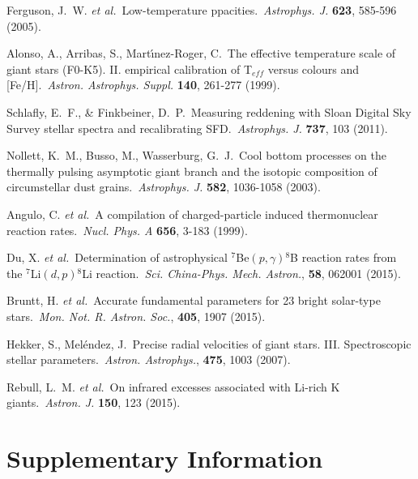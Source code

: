 \documentclass[twoside,onecolumnm,12pt]{article}
\begin{document}
\begin{thebibliography}{99}
 Ferguson, J.~W. \emph{et al.}\ Low-temperature ppacities.\ \emph{Astrophys. J.} \textbf{623}, 585-596 (2005). %

 Alonso, A., Arribas, S., Mart{\'{\i}}nez-Roger, C.\ The effective temperature scale of giant stars (F0-K5). II. empirical calibration of T$_{eff}$ versus colours and [Fe/H].\ \emph{Astron. Astrophys. Suppl.} \textbf{140}, 261-277 (1999). %

 Schlafly, E.~F., \& Finkbeiner, D.~P.\ Measuring reddening with Sloan Digital Sky Survey stellar spectra and recalibrating SFD.\ \emph{Astrophys. J.} \textbf{737}, 103 (2011). %

 Nollett, K.~M., Busso, M., Wasserburg, G.~J.\ Cool bottom processes on the thermally pulsing asymptotic giant branch and the isotopic composition of circumstellar dust grains.\ \emph{Astrophys. J.} \textbf{582}, 1036-1058 (2003). %

 Angulo, C. \emph{et al.}\ A compilation of charged-particle induced thermonuclear reaction rates.\ \emph{Nucl. Phys. A} \textbf{656}, 3-183 (1999). %

 Du, X. \emph{et al.}\ Determination of astrophysical $^7$Be$(p, \gamma)$$^8$B reaction rates from the $^7$Li$(d, p)$$^8$Li reaction.\ \emph{Sci. China-Phys. Mech. Astron.}, \textbf{58}, 062001 (2015). %

 Bruntt, H. \emph{et al.}\ Accurate fundamental parameters for 23 bright solar-type stars.\ \emph{Mon. Not. R. Astron. Soc.}, \textbf{405}, 1907 (2015). %

 Hekker, S., Mel{\'e}ndez, J.\ Precise radial velocities of giant stars. III. Spectroscopic stellar parameters.\ \emph{Astron. Astrophys.}, \textbf{475}, 1003 (2007). %

 Rebull, L.~M. \emph{et al.}\ On infrared excesses associated with Li-rich K giants.\ \emph{Astron. J.} \textbf{150}, 123 (2015). %

\end{thebibliography}


\clearpage
\small
\section*{Supplementary Information}
\setcounter{table}{0}
\setcounter{figure}{0}
\end{document}
